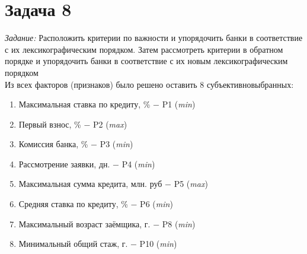 \documentclass[14pt,fleqn]{extarticle}
\begin{document}
	\newpage
	\section*{Задача 8}
	\textit{Задание:} Расположить критерии по важности и упорядочить банки в соответствие с их лексикографическим порядком. Затем рассмотреть критерии в обратном порядке и упорядочить банки в соответствие с их новым лексикографическим порядком\\
	
	Из всех факторов (признаков) было решено оставить 8 субъективновыбранных:
	\begin{enumerate}[nolistsep]
		\item Максимальная ставка по кредиту, \% $-$ P1 (\textit{min})
		\item Первый взнос, \% $-$ P2 (\textit{max})
		\item Комиссия банка, \% $-$ P3 (\textit{min})
		\item Рассмотрение заявки, дн. $-$ P4 (\textit{min})
		\item Максимальная сумма кредита, млн. руб $-$ P5 (\textit{max})
		\item Средняя ставка по кредиту, \% $-$ P6 (\textit{min})
		\item Максимальный возраст заёмщика, г. $-$ P8 (\textit{min})
		\item Минимальный общий стаж, г. $-$ P10 (\textit{min})
	\end{enumerate}
\end{document}
